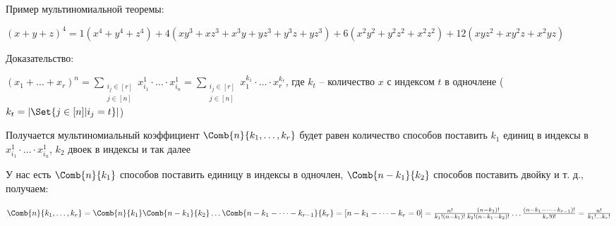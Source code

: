 \documentclass[12pt]{article}
\begin{document}
    \Ex Пример мультиномиальной теоремы:

    $(x + y + z)^4 = 1 (x^4 + y^4 + z^4) + 4 (xy^3 + xz^3 + x^3y + yz^3 + y^3z + yz^3) +
    6(x^2y^2 + y^2z^2 + x^2z^2) + 12 (xyz^2 + xy^2z + x^2yz)$

    Доказательство:

    \begin{MyProof}
        $(x_1 + \dots + x_r)^n = \sum_{\substack{i_j \in [r] \\ j \in [n]}} x_{i_1}^1 \cdot \dots \cdot x_{i_n}^1 =
        \sum_{\substack{i_j \in [r] \\ j \in [n]}} x_1^{k_1} \cdot \dots \cdot x_r^{k_r}$, где $k_t$ -- количество $x$ с индексом $t$ в одночлене ($k_t = |\Set{j \in [n] | i_j = t}|$)

        Получается мультиномиальный коэффициент $\Comb{n}{k_1, \dots, k_r}$
        будет равен количество способов поставить $k_1$ единиц в индексы в $x_{i_1}^1 \cdot \dots \cdot x_{i_n}^1$, $k_2$ двоек в индексы и так далее

        У нас есть $\Comb{n}{k_1}$ способов поставить единицу в индексы в одночлен,
        $\Comb{n - k_1}{k_2}$ способов поставить двойку и т. д., получаем:

        $\Comb{n}{k_1, \dots, k_r} = \Comb{n}{k_1} \Comb{n - k_1}{k_2} \dots \Comb{n - k_1 - \dots - k_{r - 1}}{k_r} = [n - k_1 - \dots - k_r = 0] = \\
        \frac{n!}{k_1! (n - k_1)!} \frac{(n - k_1)!}{k_2! (n - k_1 - k_2)!} \dots \frac{(n - k_1 - \dots - k_{r - 1})!}{k_r! 0!} = \frac{n!}{k_1! \dots k_r!}$

    \end{MyProof}
\end{document}
